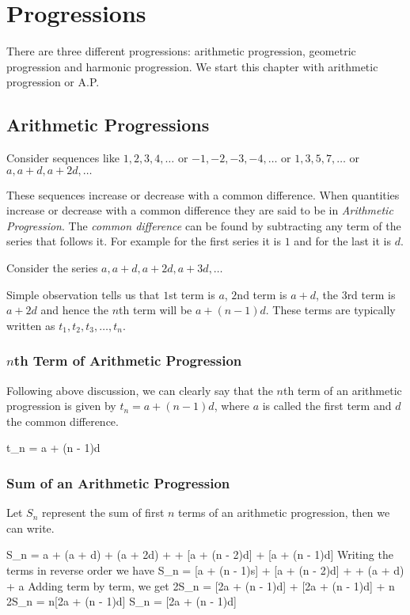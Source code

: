 \chapter{Progressions}
There are three different progressions: arithmetic progression, geometric progression and harmonic progression. We start this
chapter with arithmetic progression or A.P.

\section{Arithmetic Progressions}
Consider sequences like $1, 2, 3, 4, \ldots$ or $-1, -2, -3, -4, \ldots$ or $1, 3, 5, 7, \ldots$ or $a, a + d, a + 2d, \ldots$

These sequences increase or decrease with a common difference. When quantities increase or decrease with a common difference they
are said to be in {\it Arithmetic Progression}. The {\it common difference} can be found by subtracting any term of the
series that follows it. For example for the first series it is $1$ and for the last it is $d$.

Consider the series $a, a + d, a + 2d, a + 3d, \ldots$

Simple observation tells us that $1$st term is $a$, $2$nd term is $a + d$, the $3$rd term is $a + 2d$ and hence the $n$th term will
be $a + (n - 1)d$. These terms are typically written as $t_1, t_2, t_3, \ldots, t_n$.

\subsection{$n$th Term of Arithmetic Progression}
Following above discussion, we can clearly say that the $n$th term of an arithmetic progression is given by $t_n = a + (n - 1)d$,
where $a$ is called the first term and $d$ the common difference.

\placeformula\startformula t_n = a + (n - 1)d\stopformula

\subsection{Sum of an Arithmetic Progression}
Let $S_n$ represent the sum of first $n$ terms of an arithmetic progression, then we can write.

\startformula S_n = a + (a + d) + (a + 2d) + \cdots + [a + (n - 2)d] + [a + (n - 1)d]\stopformula
Writing the terms in reverse order we have
\startformula S_n = [a + (n - 1)s] + [a + (n - 2)d] + \cdots + (a + d) + a\stopformula
Adding term by term, we get
\startformula 2S_n = [2a + (n - 1)d] + [2a + (n - 1)d] + \cdots{}n\stopformula
  \startformula 2S_n = n[2a + (n - 1)d]\stopformula
\placeformula\startformula S_n = [2a + (n - 1)d]\stopformula

